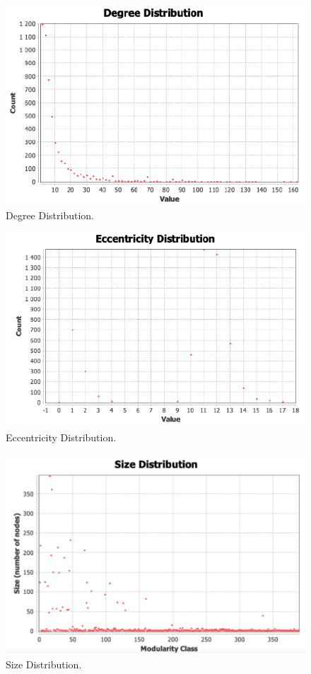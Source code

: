 \documentclass[a4paper,article,14pt]{extarticle}
\begin{document}
	\begin{figure}[h!]
		\centering
		\includegraphics[scale=0.5]{degree.png}
		\caption{Degree Distribution.}
		\label{degree}
	\end{figure} 

	\begin{figure}[h!]
		\centering
		\includegraphics[scale=0.5]{eccentricity.png}
		\caption{Eccentricity Distribution.}
		\label{eccentricity}
	\end{figure} 

	\begin{figure}[h!]
		\centering
		\includegraphics[scale=0.35]{size.png}
		\caption{Size Distribution.}
		\label{size}
	\end{figure} 
\end{document}
